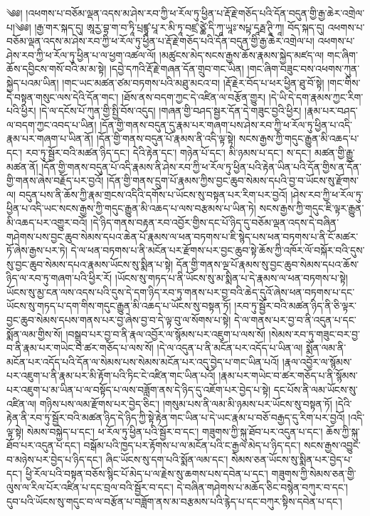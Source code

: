 ༄༅། །འཕགས་པ་བཅོམ་ལྡན་འདས་མ་ཤེས་རབ་ཀྱི་ཕ་རོལ་ཏུ་ཕྱིན་པ་རྡོ་རྗེ་གཅོད་པའི་དོན་བདུན་གྱི་རྒྱ་ཆེར་འགྲེལ་པ།༄༅། །རྒྱ་གར་སྐད་དུ། ཨཱརྱ་བྷ་ག་བ་ཏཱི་པྲཛྙཱ་པཱ་ར་མི་ཏཱ་བཛྲ་ཙྪེ་དི་ཀཱ་ཡཱཿ་སཔྟ་དཱརྠ་ཊཱི་ཀཱ། བོད་སྐད་དུ། འཕགས་པ་བཅོམ་ལྡན་འདས་མ་ཤེས་རབ་ཀྱི་ཕ་རོལ་ཏུ་ཕྱིན་པ་རྡོ་རྗེ་གཅོད་པའི་དོན་བདུན་གྱི་རྒྱ་ཆེར་འགྲེལ་པ། འཕགས་པ་ཤེས་རབ་ཀྱི་ཕ་རོལ་ཏུ་ཕྱིན་པ་ལ་ཕྱག་འཚལ་ལོ། །མཚུངས་མེད་སངས་རྒྱས་ཆོས་རྣམས་སྐྱེད་མཛད་ལ། གང་ཞིག་ཆོས་དབྱིངས་གསོ་བའི་མ་མ་སྟེ། །དབྱེ་དཀའི་རྡོ་རྗེ་གཞན་དོན་གྲུབ་གང་ཡིན། །གང་ཞིག་བཟུང་བས་འཕགས་ཀུན་སྐྱེད་པའམ་ཡིན། །གང་ཡང་མཚན་ཙམ་བཏགས་པའི་མཐུ་མངའ་བ། །རྡོ་རྗེར་བོད་པ་ཕར་ཕྱིན་ཐུ་བོ་སྟེ། །གང་གིས་དེ་བསྟན་གསུང་ལས་དེའི་དོན་གང་། །ཐོས་ནས་བདག་ཀྱང་དེ་འཛིན་ལ་བརྩོན་གྱུར། །དེ་ཡི་དེ་དག་རྣམས་ཀྱང་རིག་པའི་ཕྱིར། །དེ་ལ་དངོས་པོ་ཀུན་གྱི་སྤྱི་བོས་འདུད། །གཞན་གྱི་བཤད་སྦྱར་དོན་དེ་གཟུང་བྱའི་ཕྱིར། །རྣམ་པར་བཤད་ལ་བདག་ཀྱང་འབད་པ་ཡིན། །དོན་གྱི་གནས་བདུན་དུ་རྣམ་པར་གཞག་པས་ཤེས་རབ་ཀྱི་ཕ་རོལ་ཏུ་ཕྱིན་པ་འདི་རྣམ་པར་གཞག་པ་ཡིན་ནོ། །དོན་གྱི་གནས་བདུན་པོ་རྣམས་ནི་འདི་ལྟ་སྟེ། སངས་རྒྱས་ཀྱི་གདུང་རྒྱུན་མི་འཆད་པ་དང་། རབ་ཏུ་སྦྱོར་བའི་མཚན་ཉིད་དང་། དེའི་རྟེན་དང་། གཉེན་པོ་དང་། མི་ཉམས་པ་དང་། ས་དང་། མཚན་གྱི་རྒྱུ་མཚན་ནོ། །དོན་གྱི་གནས་བདུན་པོ་འདི་རྣམས་ནི་ཤེས་རབ་ཀྱི་ཕ་རོལ་ཏུ་ཕྱིན་པའི་རྟེན་ཡིན་པའི་དོན་གྱིས་ན་དོན་གྱི་གནས་ཞེས་བརྗོད་པར་བྱའོ། །དོན་གྱི་གནས་དྲུག་པོ་རྣམས་ཀྱིས་བྱང་ཆུབ་སེམས་དཔའི་བྱ་བ་ཡོངས་སུ་རྫོགས་ལ། བདུན་པས་ནི་ཆོས་ཀྱི་རྣམ་གྲངས་འདིའི་དགོས་པ་ཡོངས་སུ་བསྟན་པར་རིག་པར་བྱའོ། །ཤེས་རབ་ཀྱི་ཕ་རོལ་ཏུ་ཕྱིན་པ་འདི་ཡང་སངས་རྒྱས་ཀྱི་གདུང་རྒྱུན་མི་འཆད་པ་ལས་བརྩམས་པ་ཡིན་ཏེ། སངས་རྒྱས་ཀྱི་གདུང་ཇི་ལྟར་རྒྱུན་མི་འཆད་པར་འགྱུར་བའོ། །དེ་ཉིད་གནས་བརྟན་རབ་འབྱོར་གྱིས་དང་པོ་ཉིད་དུ་བཅོམ་ལྡན་འདས་དེ་བཞིན་གཤེགས་པས་བྱང་ཆུབ་སེམས་དཔའ་ཆེན་པོ་རྣམས་ལ་ཕན་བཏགས་པ་ཇི་སྙེད་པས་ཕན་བཏགས་པ་ནི་ངོ་མཚར་ཏོ་ཞེས་རྒྱས་པར་ཏེ། དེ་ལ་ཕན་བཏགས་པ་ནི་མངོན་པར་རྫོགས་པར་བྱང་ཆུབ་སྟེ་ཆོས་ཀྱི་འཁོར་ལོ་བསྐོར་བའི་དུས་སུ་བྱང་ཆུབ་སེམས་དཔའ་རྣམས་ཡོངས་སུ་སྨིན་པ་སྟེ། དོན་གྱི་གནས་ལྔ་པོ་རྣམས་སུ་བྱང་ཆུབ་སེམས་དཔའ་ཆོས་ཉིད་ལ་རབ་ཏུ་གཞག་པའི་ཕྱིར་རོ། །ཡོངས་སུ་གཏད་པ་ནི་ཡོངས་སུ་མ་སྨིན་པ་དེ་རྣམས་ལ་ཕན་བཏགས་པ་སྟེ། ཡོངས་སུ་མྱ་ངན་ལས་འདས་པའི་དུས་དེ་དག་ཉིད་རབ་ཏུ་གནས་པར་བྱ་བའི་ཆེད་དུའོ་ཞེས་ཕན་བཏགས་པ་དང་ཡོངས་སུ་གཏད་པ་དག་གིས་གདུང་རྒྱུན་མི་འཆད་པ་ཡོངས་སུ་བསྟན་ཏོ། །རབ་ཏུ་སྦྱོར་བའི་མཚན་ཉིད་ནི་ཅི་ལྟར་བྱང་ཆུབ་སེམས་དཔས་གནས་པར་བྱ་ཞེས་བྱ་བ་དེ་ལྟ་བུ་ལ་སོགས་པ་སྟེ། དེ་ལ་གནས་པར་བྱ་བ་ནི་འདུན་པ་དང་སྨོན་ལམ་གྱིས་སོ། །བསྒྲུབ་པར་བྱ་བ་ནི་རྣལ་འབྱོར་ལ་སྙོམས་པར་འཇུག་པ་ལས་སོ། །སེམས་རབ་ཏུ་གཟུང་བར་བྱ་བ་ནི་རྣམ་པར་གཡེང་བ་ཚར་གཅོད་པ་ལས་སོ། །དེ་ལ་འདུན་པ་ནི་མངོན་པར་འདོད་པ་ཡིན་ལ། སྨོན་ལམ་ནི་མངོན་པར་འདོད་པའི་དོན་ལ་སེམས་པས་སེམས་མངོན་པར་འདུ་བྱེད་པ་གང་ཡིན་པའོ། །རྣལ་འབྱོར་ལ་སྙོམས་པར་འཇུག་པ་ནི་རྣམ་པར་མི་རྟོག་པའི་ཏིང་ངེ་འཛིན་གང་ཡིན་པའོ། །རྣམ་པར་གཡེང་བ་ཚར་གཅོད་པ་ནི་སྙོམས་པར་འཇུག་པ་མ་ཡིན་པ་ལ་བསྟོད་པ་ལས་བཟློག་ནས་དེ་ཉིད་དུ་འཇོག་པར་བྱེད་པ་སྟེ། དང་པོས་ནི་ལམ་ཡོངས་སུ་འཛིན་ལ། གཉིས་པས་ལམ་རྫོགས་པར་བྱེད་ཅིང་། །གསུམ་པས་ནི་ལམ་མི་ཉམས་པར་ཡོངས་སུ་བསྟན་ཏོ། །དེའི་རྟེན་ནི་རབ་ཏུ་སྦྱོར་བའི་མཚན་ཉིད་དེ་ཉིད་ཀྱི་སྟེ་རྟེན་གང་ཡིན་པ་དེ་ཡང་རྣམ་པ་བཅོ་བརྒྱད་དུ་རིག་པར་བྱའོ། །འདི་ལྟ་སྟེ། སེམས་བསྐྱེད་པ་དང་། ཕ་རོལ་ཏུ་ཕྱིན་པའི་སྦྱོར་བ་དང་། གཟུགས་ཀྱི་སྐུ་ཐོབ་པར་འདུན་པ་དང་། ཆོས་ཀྱི་སྐུ་ཐོབ་པར་འདུན་པ་དང་། བསྒོམ་པའི་ཁྱད་པར་རྟོགས་པ་ལ་མངོན་པའི་ང་རྒྱལ་མེད་པ་ཉིད་དང་། སངས་རྒྱས་འབྱུང་བ་མཉེས་པར་བྱེད་པ་ཉིད་དང་། ཞིང་ཡོངས་སུ་དག་པའི་སྨོན་ལམ་དང་། སེམས་ཅན་ཡོངས་སུ་སྨིན་པར་བྱེད་པ་དང་། ཕྱི་རོལ་པའི་བསྟན་བཅོས་སྙིང་པོ་མེད་པ་ལ་རྗེས་སུ་ཆགས་པས་དབེན་པ་དང་། གཟུགས་ཀྱི་སེམས་ཅན་གྱི་ལུས་ལ་རིལ་པོར་འཛིན་པ་དང་བྲལ་བའི་སྦྱོར་བ་དང་། དེ་བཞིན་གཤེགས་པ་མཆོད་ཅིང་བསྙེན་བཀུར་བ་དང་། དུབ་པའི་ཡོངས་སུ་གདུང་བ་ལ་བརྩོན་པ་བཟློག་ནས་མ་བརྩམས་པའི་རྙེད་པ་དང་བཀུར་སྟིས་དབེན་པ་དང་། 